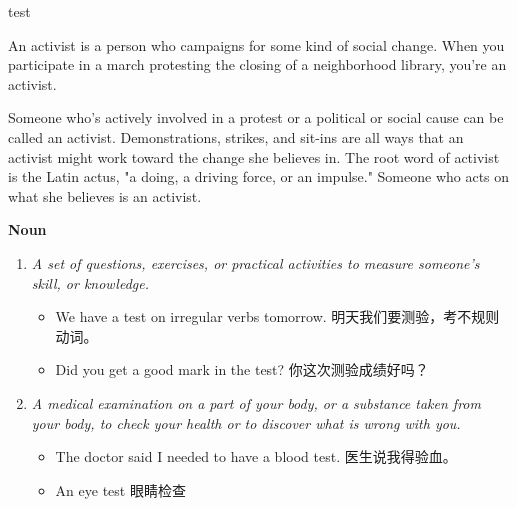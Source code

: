 
\clearpage
\noindent
\colorbox{bgcolor}{\parbox{\dimexpr\linewidth-2\fboxsep}{
    \lipsum[2] %
}}
\vspace{0.5cm}
\noindent

\begin{contentbox}{test}

An activist is a person who campaigns for some kind of social change. When you participate in a march protesting the closing of a neighborhood library, you're an activist.

\vspace{0.5cm}

Someone who's actively involved in a protest or a political or social cause can be called an activist. Demonstrations, strikes, and sit-ins are all ways that an activist might work toward the change she believes in. The root word of activist is the Latin actus, "a doing, a driving force, or an impulse." Someone who acts on what she believes is an activist.

\end{contentbox}

\noindent\textbf{Noun}
\begin{enumerate}[leftmargin=*, topsep=0pt]
\item \textit{A set of questions, exercises, or practical activities to measure someone’s skill, or knowledge.}
\textcolor{examplecolor}{
\begin{itemize}[leftmargin=*, topsep=0pt]
\item We have a test on irregular verbs tomorrow. 明天我们要测验，考不规则动词。
\item Did you get a good mark in the test? 你这次测验成绩好吗？
\end{itemize}
}
\item \textit{A medical examination on a part of your body, or a substance taken from your body, to check your health or to discover what is wrong with you.}
\textcolor{examplecolor}{
\begin{itemize}[leftmargin=*, topsep=0pt]
\item The doctor said I needed to have a blood test. 医生说我得验血。
\item An eye test 眼睛检查
\end{itemize}
}
\end{enumerate}

